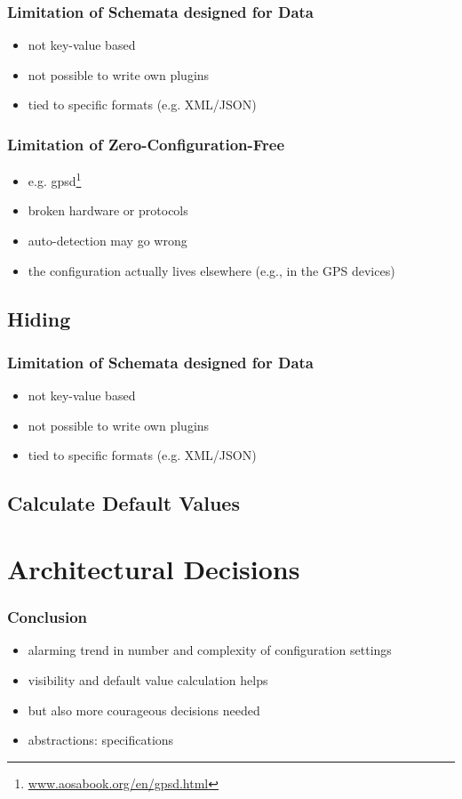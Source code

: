 \documentclass{beamer}
\begin{document}
\begin{frame}
	\frametitle{Limitation of Schemata designed for Data}
	\begin{itemize}
	\item not key-value based
	\item not possible to write own plugins
	\item tied to specific formats (e.g. XML/JSON)
	\end{itemize}
\end{frame}

\begin{frame}
	\frametitle{Limitation of Zero-Configuration-Free}
	\begin{itemize}
	\item e.g. gpsd\footnote{\url{www.aosabook.org/en/gpsd.html}}
	\item broken hardware or protocols
	\item auto-detection may go wrong
	\item the configuration actually lives elsewhere (e.g., in the GPS devices)
	\end{itemize}
\end{frame}

\subsection{Hiding}

\begin{frame}
	\frametitle{Limitation of Schemata designed for Data}
	\methodQuestion{}
	\begin{itemize}
	\item not key-value based
	\item not possible to write own plugins
	\item tied to specific formats (e.g. XML/JSON)
	\end{itemize}
\end{frame}

\subsection{Calculate Default Values}


\section{Architectural Decisions}


\begin{frame}
	\frametitle{Conclusion}
	\begin{itemize}
	\item alarming trend in number and complexity of configuration settings
	\item visibility and default value calculation helps
	\item but also more courageous decisions needed
	\item abstractions: specifications
	\end{itemize}
\end{frame}



\nocite{raab2017introducing}

\appendix

\begin{frame}[allowframebreaks]
	
	
\end{frame}
\end{document}
